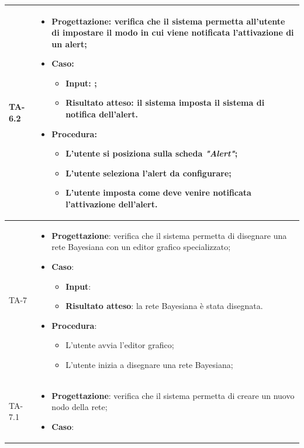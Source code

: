 \begin{longtable}{|C{2.5cm}|C{13cm}|}
\hline
{TA-6.2} &
\begin{itemize}
	\item \textbf{Progettazione}: verifica che il sistema permetta all'utente di impostare il modo in cui viene notificata l'attivazione di un alert;
	\item \textbf{Caso}: 
	\begin{itemize}
		\item \textbf{Input}: ;
		\item \textbf{Risultato atteso}: il sistema imposta il sistema di notifica dell'alert.
	\end{itemize}
	\item \textbf{Procedura}:
	\begin{itemize}
		\item L'utente si posiziona sulla scheda \emph{"Alert"};
		\item L'utente seleziona l'alert da configurare;
		\item L'utente imposta come deve venire notificata l'attivazione dell'alert. 
	\end{itemize} 
\end{itemize} \\
\hline
{TA-7} &
\begin{itemize}
	\item \textbf{Progettazione}: verifica che il sistema permetta di disegnare una rete Bayesiana con un editor grafico specializzato;
	\item \textbf{Caso}: 
	\begin{itemize}
		\item \textbf{Input}:
		\item \textbf{Risultato atteso}: la rete Bayesiana è stata disegnata.
	\end{itemize}
	\item \textbf{Procedura}:
	\begin{itemize}
		\item L'utente avvia l'editor grafico;
		\item L'utente inizia a disegnare una rete Bayesiana;
	\end{itemize} 
\end{itemize} \\
\hline
{TA-7.1} &
\begin{itemize}
	\item \textbf{Progettazione}: verifica che il sistema permetta di creare un nuovo nodo della rete;
	\item \textbf{Caso}: 
	\begin{itemize}

\end{itemize}
\end{itemize}
\end{longtable}
